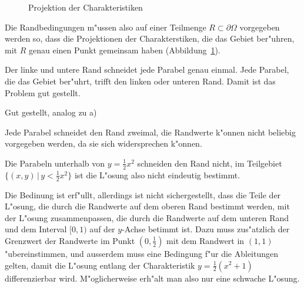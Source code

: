 \begin{loesung}
\begin{figure}
\begin{center}
\end{center}
\caption{Projektion der Charakteristiken\label{30000006:char}}
\end{figure}
Die Randbedingungen m"ussen also auf einer Teilmenge $R\subset \partial\Omega$
vorgegeben werden so, dass die Projektionen der Charakterstiken, die das
Gebiet ber"uhren, mit $R$ genau einen Punkt gemeinsam haben (Abbildung~\ref{30000006:char}). 
\begin{teilaufgaben}
\item Der linke und untere Rand schneidet jede Parabel genau einmal. 
Jede Parabel, die das Gebiet ber"uhrt, trifft den linken oder unteren
Rand. Damit ist das Problem gut gestellt.
\item Gut gestellt, analog zu a)
\item Jede Parabel schneidet den Rand zweimal, die Randwerte k"onnen nicht
beliebig vorgegeben werden, da sie sich widersprechen k"onnen.
\item Die Parabeln unterhalb von $y=\frac12x^2$ schneiden den Rand
nicht, im Teilgebiet $\{(x,y)\,|\, y<\frac12x^2\}$ ist die L"osung also
nicht eindeutig bestimmt.
\item Die Bedinung ist erf"ullt, allerdings ist nicht sichergestellt,
dass die Teile der L"osung, die durch die Randwerte auf dem oberen 
Rand bestimmt werden, mit der L"osung zusammenpassen, die durch
die Randwerte auf dem unteren Rand und dem Interval $[0,1)$ auf
der $y$-Achse betimmt ist. Dazu muss zus"atzlich der Grenzwert
der Randwerte im Punkt $(0,\frac12)$ mit dem Randwert in $(1,1)$
"ubereinstimmen, und ausserdem muss eine Bedingung f"ur die Ableitungen
gelten, damit die L"osung entlang der Charakteristik $y=\frac12(x^2+1)$
differenzierbar wird. M"oglicherweise erh"alt man also nur eine
schwache L"osung.
\end{teilaufgaben}
\end{loesung}
